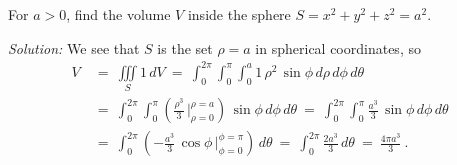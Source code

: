 \begin{exmp}\label{exmp:volsphere}
 For $a > 0$, find the volume $V$ inside the sphere $S = x^2 + y^2 + z^2 = a^2$.\smallskip
 \par\noindent\emph{Solution:} We see that $S$ is the set $\rho = a$ in spherical coordinates, so
 \begin{align*}
  V ~&=~ \iiint\limits_{S} 1\,dV
   ~=~ \int_0^{2\pi} \int_0^{\pi} \int_0^a 1 \,\rho^2 \,\sin \phi \,d\rho\,d\phi\,d\theta\\
   &=~ \int_0^{2\pi} \int_0^{\pi} \left( \frac{\rho^3}{3}\,\Big|_{\rho=0}^{\rho=a}\right)\,\sin \phi \,d\phi\,d\theta
   ~=~ \int_0^{2\pi} \int_0^{\pi} \frac{a^3}{3}\,\sin \phi\,d\phi\,d\theta\\
   &=~ \int_0^{2\pi} \left(  -\frac{a^3}{3}\,\cos \phi\,\Big|_{\phi=0}^{\phi=\pi} \right) \,d\theta
   ~=~ \int_0^{2\pi} \frac{2a^3}{3}\,d\theta
   ~=~ \frac{4\pi a^3}{3} ~.
 \end{align*}
\end{exmp}
\startexercises\label{sec3dot5}
